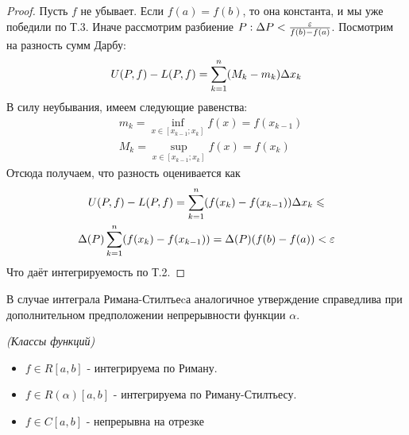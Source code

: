 \begin{proof}
	Пусть $f$ не убывает. Если $f(a) = f(b)$, то она константа, и мы уже победили по Т.3. Иначе рассмотрим разбиение $P: \Delta P < \frac{\varepsilon}{f(b) - f(a)} $. Посмотрим на разность сумм Дарбу:
	\[
		U(P, f) - L(P, f) = \sum\limits_{k = 1}^n (M_k - m_k) \Delta x_k
	\]
	В силу неубывания, имеем следующие равенства:
	\begin{align*}
		&{m_k = \inf\limits_{x \in [x_{k - 1}; x_k]} f(x) = f(x_{k - 1})}
		\\
		&{M_k = \sup\limits_{x \in [x_{k - 1}; x_k]} f(x) = f(x_k)}
	\end{align*}
	Отсюда получаем, что разность оценивается как
	\begin{multline*}
		U(P, f) - L(P, f) = \sum\limits_{k = 1}^n (f(x_k) - f(x_{k - 1})) \Delta x_k \leqslant
		\\
		\Delta(P) \sum\limits_{k = 1}^n (f(x_k) - f(x_{k - 1})) = \Delta(P)(f(b) - f(a)) < \varepsilon
	\end{multline*}
	Что даёт интегрируемость по Т.2.
\end{proof}

\begin{note}
	В случае интеграла 
	Римана-Стилтьеcа аналогичное утверждение справедлива при дополнительном предположении непрерывности функции $\alpha$.
\end{note}

\begin{notation} 
	\textit{(Классы функций)}
	\begin{itemize}
	\item $f \in R[a,b]$ - интегрируема по Риману.
	\item $f \in R(\alpha)[a,b]$ - интегрируема по Риману-Стилтьесу.
	\item $f \in C[a, b]$ - непрерывна на отрезке
	\end{itemize}
\end{notation}

